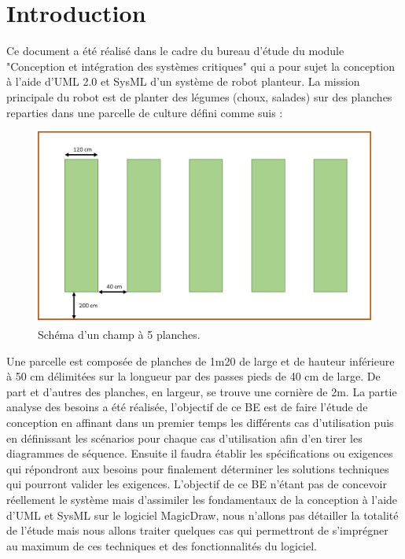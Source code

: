 \chapter*{Introduction}
\label{chap:Intro}
Ce document a été réalisé dans le cadre du bureau d'étude du module "Conception et intégration des systèmes critiques" qui a pour sujet la conception à l'aide d'UML 2.0 et SysML d'un système de robot planteur.
La mission principale du robot est de planter des légumes (choux, salades) sur des planches reparties dans une parcelle de culture défini comme suis :\\%
 \begin{figure}[!ht]
 \centering
 \includegraphics[width = .7\textwidth]{./introduction/champs_planches.png}
 \caption{Schéma d'un champ à 5 planches.}
 \end{figure}


Une parcelle est composée de planches de 1m20 de large et de hauteur inférieure à 50 cm délimitées sur la longueur par des passes pieds de 40 cm de large. De part et d'autres des planches, en largeur, se trouve une cornière de 2m.
La partie analyse des besoins a été réalisée, l'objectif de ce BE est de faire l'étude de conception en affinant dans un premier temps les différents cas d'utilisation puis en définissant les scénarios pour chaque cas d'utilisation afin d'en tirer les diagrammes de séquence. Ensuite il faudra établir les spécifications ou exigences qui répondront aux besoins pour finalement déterminer les solutions techniques qui pourront valider les exigences.
L'objectif de ce BE n'étant pas de concevoir réellement le système mais d'assimiler les fondamentaux de la conception à l'aide d'UML et SysML sur le logiciel MagicDraw, nous n'allons pas détailler la totalité de l'étude mais nous allons traiter quelques cas qui permettront de s'imprégner au maximum de ces techniques et des fonctionnalités du logiciel.

